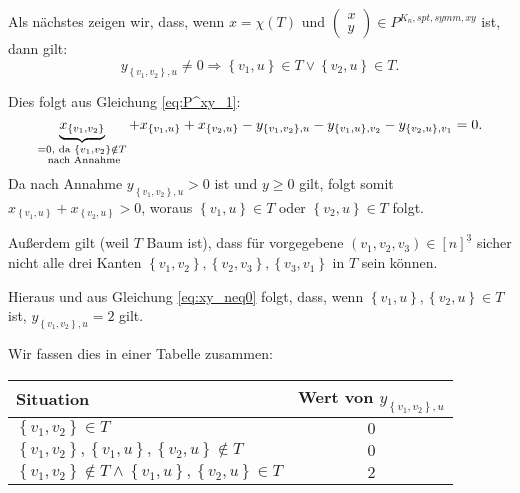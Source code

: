 \documentclass[10p,a4paper,BCOR = 12mm, DIV=15]{scrbook}
\begin{document}
{\begin{bew}
Als nächstes zeigen wir, dass, wenn $x=\chi(T)$ und $\left(\begin{array}{c}
x \\
y
\end{array}\right) \in P^{K_n, spt, symm, xy}$ ist, dann gilt:
\begin{displaymath}
y_{\left\{v_1, v_2\right\}, u} \neq 0 \Rightarrow \left\{v_1, u\right\} \in T \vee \left\{v_2, u\right\} \in T.
\end{displaymath}

Dies folgt aus Gleichung \eqref{eq:P^xy_1}:
\begin{equation}
\underbrace{x_{\left\{v_1, v_2\right\}}}_{\substack{= 0,\textnormal{ da }\left\{v_1, v_2\right\}\notin T \\ \textnormal{ nach Annahme}}} + x_{\left\{v_1, u\right\}} + x_{\left\{v_2, u\right\}} -  y_{\left\{v_1, v_2\right\}, u} - y_{\left\{v_1, u\right\}, v_2} - y_{\left\{v_2, u\right\}, v_1} = 0. \label{eq:xy_neq0}
\end{equation}
Da nach Annahme $y_{\left\{v_1, v_2\right\}, u} > 0$ ist und $y\geq 0$ gilt, folgt somit $ x_{\left\{v_1, u\right\}} + x_{\left\{v_2, u\right\}} > 0$, woraus $\left\{v_1, u\right\} \in T$ oder $\left\{v_2, u\right\} \in T$ folgt.

Außerdem gilt (weil $T$ Baum ist), dass für vorgegebene $\left(v_1, v_2, v_3\right) \in \left[n\right]^{\underline{3}}$ sicher nicht alle drei Kanten $\left\{v_1, v_2\right\}, \left\{v_2, v_3\right\}, \left\{v_3, v_1\right\}$ in $T$ sein können.

Hieraus und aus Gleichung \eqref{eq:xy_neq0} folgt, dass, wenn $\left\{v_1, u\right\}, \left\{v_2, u\right\} \in T$ ist, $y_{\left\{v_1, v_2\right\}, u} = 2$ gilt.

Wir fassen dies in einer Tabelle zusammen: \\

\begin{tabular}{| l | c |}
\hline
Situation & Wert von $y_{\left\{v_1, v_2\right\}, u}$ \\
\hline
$\left\{v_1, v_2\right\} \in T$ & $0$ \\
$\left\{v_1, v_2\right\}, \left\{v_1, u\right\}, \left\{v_2, u\right\} \notin T$ & $0$ \\
$\left\{v_1, v_2\right\} \notin T \wedge \left\{v_1, u\right\}, \left\{v_2, u\right\} \in T$ & $2$ \\
\hline
\end{tabular} \\


\end{bew}}
\end{document}
